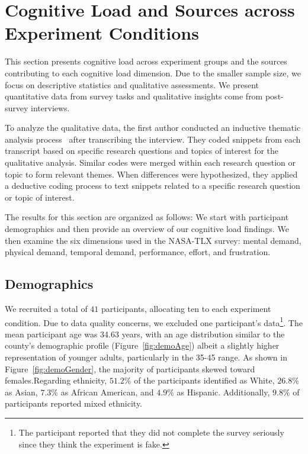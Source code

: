 \section{Cognitive Load and Sources across Experiment Conditions}
\label{sec:cog_result}
This section presents cognitive load across experiment groups and the sources contributing to each cognitive load dimension. Due to the smaller sample size, we focus on descriptive statistics and qualitative assessments. We present quantitative data from survey tasks and qualitative insights come from post-survey interviews.

To analyze the qualitative data, the first author conducted an inductive thematic analysis process~\cite{olsonWaysKnowingHCI2014} after transcribing the interview. They coded snippets from each transcript based on specific research questions and topics of interest for the qualitative analysis. Similar codes were merged within each research question or topic to form relevant themes. When differences were hypothesized, they applied a deductive coding process to text snippets related to a specific research question or topic of interest.

The results for this section are organized as follows: We start with participant demographics and then provide an overview of our cognitive load findings. We then examine the six dimensions used in the NASA-TLX survey: mental demand, physical demand, temporal demand, performance, effort, and frustration.

\subsection{Demographics}
We recruited a total of $41$ participants, allocating ten to each experiment condition. Due to data quality concerns, we excluded one participant's data\footnote{The participant reported that they did not complete the survey seriously since they think the experiment is fake.}. The mean participant age was 34.63 years, with an age distribution similar to the county's demographic profile (Figure~\ref{fig:demoAge}) albeit a slightly higher representation of younger adults, particularly in the 35-45 range. As shown in Figure~\ref{fig:demoGender}, the majority of participants skewed toward females.Regarding ethnicity, $51.2\%$ of the participants identified as White, $26.8\%$ as Asian, $7.3\%$ as African American, and $4.9\%$ as Hispanic. Additionally, $9.8\%$ of participants reported mixed ethnicity.

